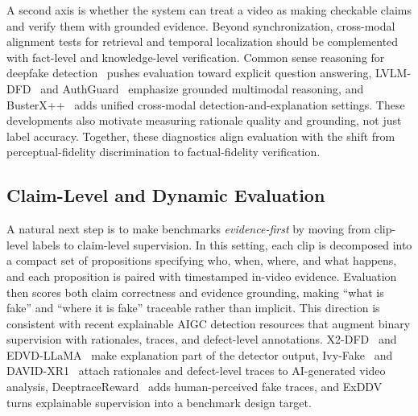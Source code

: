 A second axis is whether the system can treat a video as making checkable claims and verify them with grounded evidence.
Beyond synchronization, cross-modal alignment tests for retrieval and temporal localization should be complemented with fact-level and knowledge-level verification.
Common sense reasoning for deepfake detection~\citep{zhang2024common} pushes evaluation toward explicit question answering, LVLM-DFD~\citep{Yu2025LVLMDFD} and AuthGuard~\citep{Shen2025AuthGuard} emphasize grounded multimodal reasoning, and BusterX++~\citep{Wen2025BusterXpp} adds unified cross-modal detection-and-explanation settings. These developments also motivate measuring rationale quality and grounding, not just label accuracy.
Together, these diagnostics align evaluation with the shift from perceptual-fidelity discrimination to factual-fidelity verification.

\subsection{Claim-Level and Dynamic Evaluation}
\label{sec:eval-evidence}

A natural next step is to make benchmarks \emph{evidence-first} by moving from clip-level labels to claim-level supervision.
In this setting, each clip is decomposed into a compact set of propositions specifying who, when, where, and what happens, and each proposition is paired with timestamped in-video evidence.
Evaluation then scores both claim correctness and evidence grounding, making ``what is fake'' and ``where it is fake'' traceable rather than implicit.
This direction is consistent with recent explainable AIGC detection resources that augment binary supervision with rationales, traces, and defect-level annotations.
X2-DFD~\citep{chen2024x2dfd} and EDVD-LLaMA~\citep{sun2025edvd} make explanation part of the detector output, Ivy-Fake~\citep{jiang2025ivy} and DAVID-XR1~\citep{gao2025david} attach rationales and defect-level traces to AI-generated video analysis, DeeptraceReward~\citep{Fu2025DeeptraceReward} adds human-perceived fake traces, and ExDDV~\citep{hondru2025exddv} turns explainable supervision into a benchmark design target.

